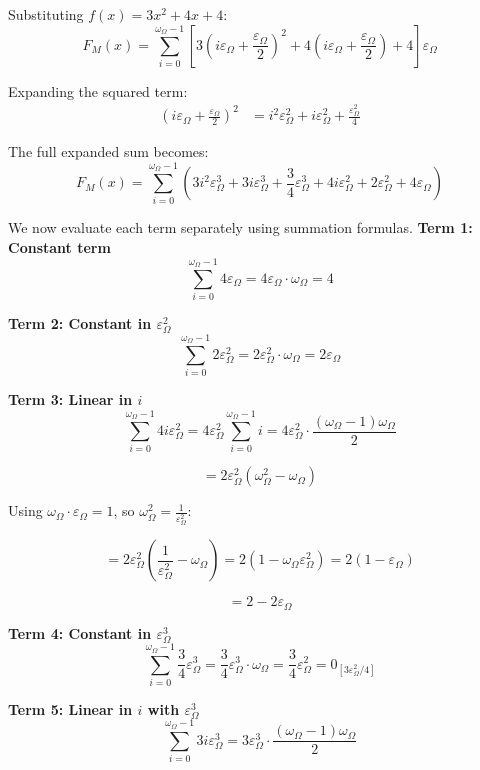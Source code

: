 \documentclass{article}
\begin{document}
Substituting $f(x) = 3x^2 + 4x + 4$:
$$F_M(x) = \sum_{i=0}^{\omega_\Omega - 1} \left[3\left(i\varepsilon_\Omega + \frac{\varepsilon_\Omega}{2}\right)^2 + 4\left(i\varepsilon_\Omega + \frac{\varepsilon_\Omega}{2}\right) + 4\right] \varepsilon_\Omega$$

Expanding the squared term:
\begin{align*}
\left(i\varepsilon_\Omega + \frac{\varepsilon_\Omega}{2}\right)^2 &= i^2\varepsilon_\Omega^2 + i\varepsilon_\Omega^2 + \frac{\varepsilon_\Omega^2}{4}
\end{align*}

The full expanded sum becomes:
$$F_M(x) = \sum_{i=0}^{\omega_\Omega - 1} \left(3i^2\varepsilon_\Omega^3 + 3i\varepsilon_\Omega^3 + \frac{3}{4}\varepsilon_\Omega^3 + 4i\varepsilon_\Omega^2 + 2\varepsilon_\Omega^2 + 4\varepsilon_\Omega\right)$$

We now evaluate each term separately using summation formulas.
\textbf{Term 1: Constant term}
$$\sum_{i=0}^{\omega_\Omega - 1} 4\varepsilon_\Omega = 4\varepsilon_\Omega \cdot \omega_\Omega = 4$$

\textbf{Term 2: Constant in $\varepsilon_\Omega^2$}
$$\sum_{i=0}^{\omega_\Omega - 1} 2\varepsilon_\Omega^2 = 2\varepsilon_\Omega^2 \cdot \omega_\Omega = 2\varepsilon_\Omega$$

\textbf{Term 3: Linear in $i$}
$$\sum_{i=0}^{\omega_\Omega - 1} 4i\varepsilon_\Omega^2 = 4\varepsilon_\Omega^2 \sum_{i=0}^{\omega_\Omega - 1} i = 4\varepsilon_\Omega^2 \cdot \frac{(\omega_\Omega - 1)\omega_\Omega}{2}$$

$$= 2\varepsilon_\Omega^2(\omega_\Omega^2 - \omega_\Omega)$$

Using $\omega_\Omega \cdot \varepsilon_\Omega = 1$, so $\omega_\Omega^2 = \frac{1}{\varepsilon_\Omega^2}$:

$$= 2\varepsilon_\Omega^2\left(\frac{1}{\varepsilon_\Omega^2} - \omega_\Omega\right) = 2(1 - \omega_\Omega\varepsilon_\Omega^2) = 2(1 - \varepsilon_\Omega)$$

$$= 2 - 2\varepsilon_\Omega $$

\textbf{Term 4: Constant in $\varepsilon_\Omega^3$}
$$\sum_{i=0}^{\omega_\Omega - 1} \frac{3}{4}\varepsilon_\Omega^3 = \frac{3}{4}\varepsilon_\Omega^3 \cdot \omega_\Omega = \frac{3}{4}\varepsilon_\Omega^2 = 0_{[3\varepsilon_\Omega^2/4]}$$

\textbf{Term 5: Linear in $i$ with $\varepsilon_\Omega^3$}
$$\sum_{i=0}^{\omega_\Omega - 1} 3i\varepsilon_\Omega^3 = 3\varepsilon_\Omega^3 \cdot \frac{(\omega_\Omega - 1)\omega_\Omega}{2}$$
\end{document}
